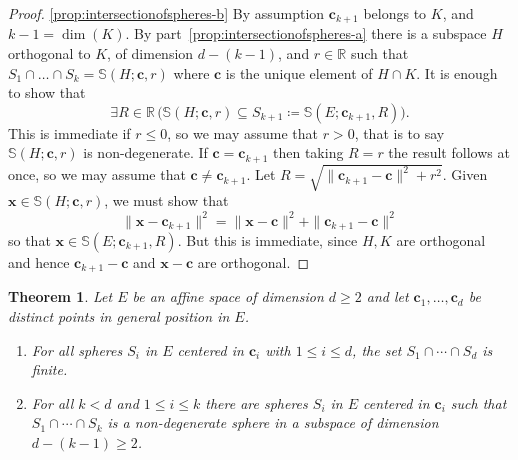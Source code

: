 \documentclass[12pt]{amsart}
\newcommand{\EXISTS}[1]{\exists {#1} \, }
\newcommand{\R}{\mathbb{R}}	%
\theoremstyle{plain}
\newtheorem{theorem}{Theorem}[section]
\theoremstyle{definition}
\theoremstyle{remark}
\begin{document}
\begin{proof}
\smallskip

\ref{prop:intersectionofspheres-b} 
By assumption \( \mathbf{c}_{ k + 1 } \) belongs to \( K \), and \( k - 1 = \dim ( K ) \).
By part~\ref{prop:intersectionofspheres-a} there is a subspace \( H \) orthogonal to \( K \), of dimension \( d - ( k - 1 ) \), and \( r \in \R \) such that \( S_1 \cap \dots \cap S_k = \mathbb{S} ( H ; \mathbf{c} , r ) \) where \( \mathbf{c} \) is the unique element of \( H \cap K \).
It is enough to show that 
\[
\EXISTS{ R \in \R } \bigl ( \mathbb{S} ( H ; \mathbf{c} , r ) \subseteq S_{ k + 1 } \coloneqq \mathbb{S} ( E ; \mathbf{c}_{ k + 1 } , R ) \bigr ) .
\]
This is immediate if \( r \leq 0 \), so we may assume that \( r > 0 \), that is to say \( \mathbb{S} ( H ; \mathbf{c} , r ) \) is non-degenerate.
If \( \mathbf{c} = \mathbf{c}_{ k + 1 } \) then taking \( R = r \) the result follows at once, so we may assume that \( \mathbf{c} \neq \mathbf{c}_{ k + 1 } \).
Let \( R = \sqrt{ \| \mathbf{c}_{ k + 1 } - \mathbf{c} \|^2 + r^2 } \).
Given \( \mathbf{x} \in \mathbb{S} ( H ; \mathbf{c} , r ) \), we must show that
\[
\| \mathbf{x} - \mathbf{c}_{ k + 1 } \|^2 = \| \mathbf{x} - \mathbf{c} \|^2 + \| \mathbf{c}_{ k + 1 } - \mathbf{c} \|^2
\] 
so that \( \mathbf{x} \in \mathbb{S} ( E ; \mathbf{c}_{ k + 1 } , R ) \).
But this is immediate, since \( H , K \) are orthogonal and hence \( \mathbf{c}_{ k + 1 } - \mathbf{c} \) and \( \mathbf{x} - \mathbf{c} \) are orthogonal.
\end{proof}

\begin{theorem}\label{th:intersectionspheres}
Let \( E \) be an affine space of dimension \( d \geq 2 \) and let \( \mathbf{c}_1 , \dots , \mathbf{c}_d \) be distinct points in general position in \( E \).
\begin{enumerate}[label={\upshape (\alph*)}]
\item\label{th:intersectionspheres-a}
For all spheres \( S_i \) in \( E \) centered in \( \mathbf{c}_i \) with \( 1 \leq i \leq d \), the set \( S_1 \cap \cdots \cap S_d \) is finite.
\item\label{th:intersectionspheres-b}
For all \( k < d \) and \( 1 \leq i \leq k \) there are spheres \( S_i \) in \( E \) centered in \( \mathbf{c}_i \) such that \( S_1 \cap \cdots \cap S_k \) is a non-degenerate sphere in a subspace of dimension \( d - ( k - 1 ) \geq 2 \).
\end{enumerate}
\end{theorem}
\end{document}
